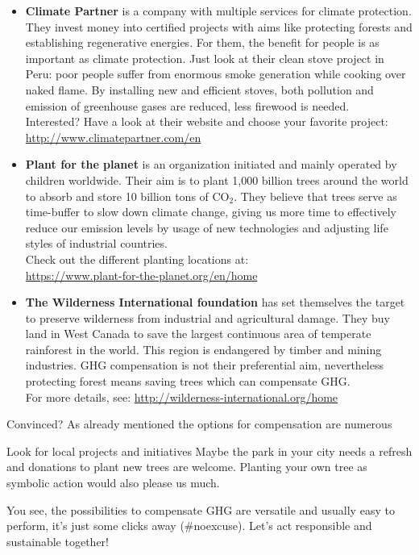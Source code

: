 \begin{itemize}
	\item 
	\textbf{Climate Partner} is a company with multiple services for climate protection.  They invest money into certified projects with aims like protecting forests and establishing regenerative energies. For them, the benefit for people is as important as climate protection. Just look at their clean stove project in Peru: poor people suffer from enormous smoke generation while cooking over naked flame. By installing new and efficient stoves, both pollution and emission of greenhouse gases are reduced, less firewood is needed. \\
	Interested? Have a look at their website and choose your favorite project: \\ \url{http://www.climatepartner.com/en} %

	\item 
	\textbf{Plant for the planet} is an organization initiated and mainly operated by children worldwide. Their aim is to plant 1,000 billion trees around the world to absorb and store 10 billion tons of CO$_2$. They believe that trees serve as time-buffer to slow down climate change, giving us more time to effectively reduce our emission levels by usage of new technologies and adjusting life styles of industrial countries. \\
	Check out the different planting locations at: \\
	\url{https://www.plant-for-the-planet.org/en/home} %

	\item 
	\textbf{The Wilderness International foundation} has set themselves the target to preserve wilderness from industrial and agricultural damage. They buy land in West Canada to save the largest continuous area of temperate rainforest in the world. This region is endangered by timber and mining industries. GHG compensation is not their preferential aim, nevertheless protecting forest means saving trees which can compensate GHG. \\
	For more details, see: \url{http://wilderness-international.org/home} %
\end{itemize}

Convinced? As already mentioned the options for compensation are numerous

\begin{suggest}{Look for local projects and initiatives} 
	Maybe the park in your city needs a refresh and donations to plant new trees are welcome. Planting your own tree as symbolic action would also please us much.	
\end{suggest}


You see, the possibilities to compensate GHG are versatile and usually easy to perform, it's just some clicks away (\#noexcuse). Let's act responsible and sustainable together!


